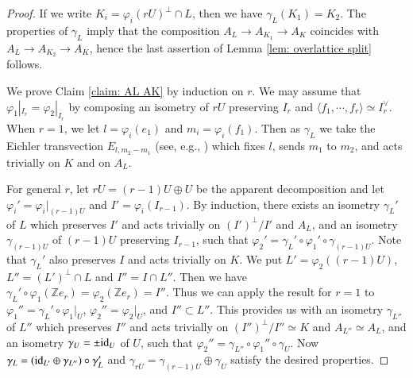 \documentclass[12pt]{amsart}
\numberwithin{equation}{section}
\theoremstyle{definition}
\theoremstyle{remark}
\newcommand{\Z}{\mathbb{Z}}
\begin{document}
\begin{proof}
If we write 
$K_{i}=\varphi_{i}(rU)^{\perp}\cap L$, 
then we have $\gamma_{L}(K_{1})=K_{2}$. 
The properties of $\gamma_{L}$ 
imply that the composition 
$A_{L}\to A_{K_{1}} \to A_{K}$ 
coincides with 
$A_{L}\to A_{K_{2}} \to A_{K}$,  
hence the last assertion of Lemma \ref{lem: overlattice split} follows.  

We prove Claim \ref{claim: AL AK} by induction on $r$. 
We may assume that $\varphi_{1}|_{I_{r}}=\varphi_{2}|_{I_{r}}$ 
by composing an isometry of $rU$ preserving $I_{r}$ 
and $\langle f_1, \cdots, f_r \rangle \simeq I_{r}^{\vee}$. 
When $r=1$, we let $l=\varphi_{i}(e_{1})$ and $m_{i}=\varphi_{i}(f_{1})$. 
Then as $\gamma_{L}$ we take the Eichler transvection $E_{l,m_{2}-m_{1}}$ (see, e.g., \cite{G-H-S}) 
which fixes $l$, sends $m_{1}$ to $m_{2}$, 
and acts trivially on $K$ and on $A_{L}$. 


For general $r$, 
let $rU=(r-1)U\oplus U$ be the apparent decomposition and let  
$\varphi_{i}'=\varphi_{i}|_{(r-1)U}$ and $I'=\varphi_{i}(I_{r-1})$. 
By induction, there exists an isometry $\gamma_{L}'$ of $L$ 
which preserves $I'$ and acts trivially on $(I')^{\perp}/I'$ and $A_{L}$, 
and an isometry $\gamma_{(r-1)U}$ of $(r-1)U$ preserving $I_{r-1}$, 
such that 
$\varphi_{2}'=\gamma_{L}' \circ \varphi_{1}' \circ \gamma_{(r-1)U}$. 
Note that $\gamma_{L}'$ also preserves $I$ and acts trivially on $K$. 
We put 
$L'=\varphi_{2}((r-1)U)$, 
$L''=(L')^{\perp}\cap L$ and 
$I''=I\cap L''$. 
Then we have 
$\gamma_{L}' \circ \varphi_{1}({\Z}e_r)=\varphi_{2}({\Z}e_{r})=I''$. 
Thus we can apply the result for $r=1$ to 
$\varphi_{1}''=\gamma_{L}' \circ \varphi_{1}|_{U}$, 
$\varphi_{2}''= \varphi_{2}|_{U}$, and 
$I''\subset L''$. 
This provides us with an isometry $\gamma_{L''}$ of $L''$ 
which preserves $I''$ and acts trivially on $(I'')^{\perp}/I''\simeq K$ and $A_{L''}\simeq A_{L}$, 
and an isometry $\gamma_{U}=\pm{\rm id}_{U}$ of $U$, 
such that 
$\varphi_{2}''=\gamma_{L''}\circ \varphi_{1}'' \circ \gamma_{U}$. 
Now 
$\gamma_{L}=({\rm id}_{L'}\oplus \gamma_{L''})\circ \gamma_{L}'$ and 
$\gamma_{rU}=\gamma_{(r-1)U} \oplus \gamma_{U}$ 
satisfy the desired properties. 
\end{proof} 
\end{document}
